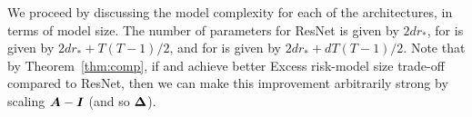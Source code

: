 
We proceed by discussing the model complexity for each of the architectures, in terms of model size. The number of parameters for ResNet is given by $2dr_*$, for \GenA{} is given by $2dr_*+ T(T-1)/2$, and for \GenB{} is given by $2dr_*+ d T(T-1)/2$. Note that by Theorem~\ref{thm:comp}, if \GenA{} and \GenB{} achieve better Excess risk-model size trade-off  compared to ResNet, then we can make this improvement arbitrarily strong by scaling ${\bm{A}}-\bm{I}$ (and so $\bm{\Delta}$).

